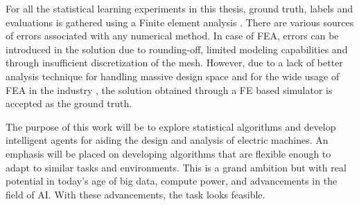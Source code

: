 For all the statistical learning experiments in this thesis, ground truth, labels and evaluations is gathered using a Finite element analysis \parencite{Magnet}. There are various sources of errors associated with any numerical method. In case of FEA, errors can be introduced in the solution due to rounding-off, limited modeling capabilities and through insufficient discretization of the mesh. However, due to a lack of better analysis technique for handling massive design space and for the wide usage of FEA in the industry \parencite{FEA_market_report}, the solution obtained through a FE based simulator is accepted as the ground truth.

The purpose of this work will be to explore statistical algorithms and develop intelligent agents for aiding the design and analysis of electric machines. An emphasis will be placed on developing algorithms that are flexible enough to adapt to similar tasks and environments. This is a grand ambition but with real potential in today's age of big data, compute power, and advancements in the field of AI. With these advancements, the task looks feasible. 


